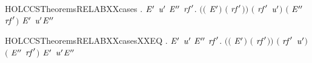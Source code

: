 \newcommand{\HOLCCSTheoremsRECXXcasesXXEQ}{\UseVerbatim{HOLCCSTheoremsRECXXcasesXXEQ}}
\begin{SaveVerbatim}{HOLCCSTheoremsRELABXXcases}
\HOLTokenTurnstile{} \HOLSymConst{\HOLTokenForall{}}   .
        \HOLTokenTransBegin{}\HOLTokenTransEnd {} \HOLSymConst{\HOLTokenImp{}}
     \HOLSymConst{\HOLTokenExists{}}\ensuremath{\HOLBoundVar{E}\sp{\prime{}}} \ensuremath{\HOLBoundVar{u}\sp{\prime{}}} \ensuremath{\HOLBoundVar{E}\sp{\prime{}\prime{}}} \ensuremath{\HOLBoundVar{rf}\sp{\prime{}}}.
       \ensuremath{(}\ensuremath{(} \HOLSymConst{\ensuremath{=}} \ensuremath{\HOLBoundVar{E}\sp{\prime{}}}\ensuremath{)} \HOLSymConst{\HOLTokenConj{}} \ensuremath{(} \HOLSymConst{\ensuremath{=}} \ensuremath{\HOLBoundVar{rf}\sp{\prime{}}}\ensuremath{)}\ensuremath{)} \HOLSymConst{\HOLTokenConj{}} \ensuremath{(} \HOLSymConst{\ensuremath{=}}  \ensuremath{\HOLBoundVar{rf}\sp{\prime{}}} \ensuremath{\HOLBoundVar{u}\sp{\prime{}}}\ensuremath{)} \HOLSymConst{\HOLTokenConj{}}
       \ensuremath{(} \HOLSymConst{\ensuremath{=}}  \ensuremath{\HOLBoundVar{E}\sp{\prime{}\prime{}}} \ensuremath{\HOLBoundVar{rf}\sp{\prime{}}}\ensuremath{)} \HOLSymConst{\HOLTokenConj{}} \ensuremath{\HOLBoundVar{E}\sp{\prime{}}} \HOLTokenTransBegin\ensuremath{\HOLBoundVar{u}\sp{\prime{}}}\HOLTokenTransEnd \ensuremath{\HOLBoundVar{E}\sp{\prime{}\prime{}}}
\end{SaveVerbatim}
\newcommand{\HOLCCSTheoremsRELABXXcases}{\UseVerbatim{HOLCCSTheoremsRELABXXcases}}
\begin{SaveVerbatim}{HOLCCSTheoremsRELABXXcasesXXEQ}
\HOLTokenTurnstile{} \HOLSymConst{\HOLTokenForall{}}   .
        \HOLTokenTransBegin{}\HOLTokenTransEnd {} \HOLSymConst{\HOLTokenEquiv{}}
     \HOLSymConst{\HOLTokenExists{}}\ensuremath{\HOLBoundVar{E}\sp{\prime{}}} \ensuremath{\HOLBoundVar{u}\sp{\prime{}}} \ensuremath{\HOLBoundVar{E}\sp{\prime{}\prime{}}} \ensuremath{\HOLBoundVar{rf}\sp{\prime{}}}.
       \ensuremath{(}\ensuremath{(} \HOLSymConst{\ensuremath{=}} \ensuremath{\HOLBoundVar{E}\sp{\prime{}}}\ensuremath{)} \HOLSymConst{\HOLTokenConj{}} \ensuremath{(} \HOLSymConst{\ensuremath{=}} \ensuremath{\HOLBoundVar{rf}\sp{\prime{}}}\ensuremath{)}\ensuremath{)} \HOLSymConst{\HOLTokenConj{}} \ensuremath{(} \HOLSymConst{\ensuremath{=}}  \ensuremath{\HOLBoundVar{rf}\sp{\prime{}}} \ensuremath{\HOLBoundVar{u}\sp{\prime{}}}\ensuremath{)} \HOLSymConst{\HOLTokenConj{}}
       \ensuremath{(} \HOLSymConst{\ensuremath{=}}  \ensuremath{\HOLBoundVar{E}\sp{\prime{}\prime{}}} \ensuremath{\HOLBoundVar{rf}\sp{\prime{}}}\ensuremath{)} \HOLSymConst{\HOLTokenConj{}} \ensuremath{\HOLBoundVar{E}\sp{\prime{}}} \HOLTokenTransBegin\ensuremath{\HOLBoundVar{u}\sp{\prime{}}}\HOLTokenTransEnd \ensuremath{\HOLBoundVar{E}\sp{\prime{}\prime{}}}
\end{SaveVerbatim}
